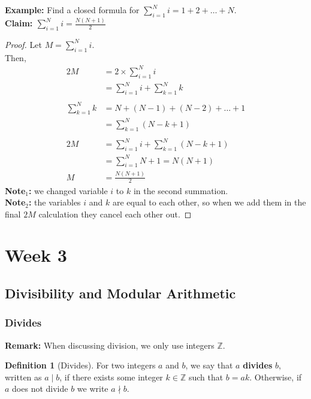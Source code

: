 \documentclass[12pt]{article}
\newcommand{\Z}{\mathbb{Z}}
\theoremstyle{definition}
\newtheorem{definition}{Definition}
\begin{document}
    \textbf{Example:} Find a closed formula for $\sum_{i=1}^{N}i=1+2+\dots+N$.\\
    \textbf{Claim: $\sum_{i=1}^{N}i = \frac{N(N+1)}{2}$}
    \begin{proof}
        Let $M = \sum_{i=1}^{N}i$. \\
        Then,
        \begin{align*}
            2M &= 2 \times \sum_{i=1}^{N}i \\
            &= \sum_{i=1}^{N}i + \sum_{k=1}^{N}k \\\\
            \sum_{k=1}^{N}k &= N + (N-1) + (N-2) + \dots + 1 \\
            &= \sum_{k=1}^{N} (N - k + 1) \\\\
            2M &= \sum_{i=1}^{N} i + \sum_{k=1}^{N} (N - k + 1) \\
            &= \sum_{i=1}^{N} N + 1 = N(N+1) \\
            M &= \frac{N(N+1)}{2}
        \end{align*}
        \textbf{Note$_{1}$:} we changed variable $i$ to $k$ in the second summation. \\
        \textbf{Note$_{2}$:} the variables $i$ and $k$ are equal to each other, so when we add
        them in the final $2M$ calculation they cancel each other out.
    \end{proof}

    \newpage
    \section{Week 3}
    \subsection{Divisibility and Modular Arithmetic}
    \subsubsection{Divides}
    \textbf{Remark:} When discussing division, we only use integers $\Z$.\\
    \begin{definition}[Divides]
        \label{def:divides}
        For two integers $a$ and $b$, we say that $a$ \textbf{divides} $b$,
        written as $a \mid b$, if there exists some integer $k \in \Z$ such that
        $b = ak$. Otherwise, if $a$ does not divide $b$ we write $a \nmid b$.
    \end{definition}
\end{document}
